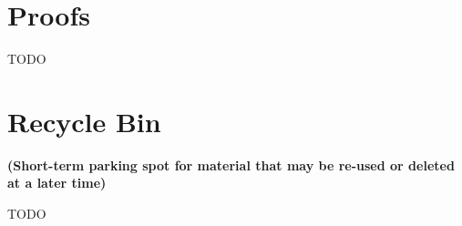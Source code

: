 \documentclass[12pt]{article}
\begin{document}
\newpage

% 

\newpage
\begin{appendices}
\section{Proofs}

TODO



\section{Recycle Bin}
{\textbf{(Short-term parking spot for material that may be re-used or deleted at a later time)}}


TODO

\end{appendices}
\end{document}
